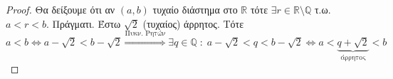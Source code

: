 \begin{proof}
\item {}
  Θα δείξουμε ότι αν $ (a,b) $ τυχαίο διάστημα στο $ \mathbb{R} $ τότε 
  $ \exists r \in \mathbb{R} \setminus \mathbb{Q} $ τ.ω. $a < r < b$. Πράγματι.
  Έστω $ \sqrt{2} $ (τυχαίος) άρρητος. Τότε
  $ a < b \Leftrightarrow a - \sqrt{2} < b- \sqrt{2} \overset{\text{Πυκν. Ρητών}}{\Rightarrow} \exists q \in \mathbb{Q} \; : \;  a - \sqrt{2} < q < b - 
  \sqrt{2} \Leftrightarrow  a < \underbrace{q + \sqrt{2}}_{\text{άρρητος}} < b $ 
\end{proof}





